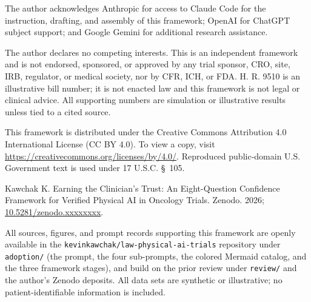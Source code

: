 
The author acknowledges Anthropic for access to Claude Code for the instruction,
drafting, and assembly of this framework; OpenAI for ChatGPT subject support; and
Google Gemini for additional research assistance.

The author declares no competing interests. This is an independent framework and is
not endorsed, sponsored, or approved by any trial sponsor, CRO, site, IRB,
regulator, or medical society, nor by CFR, ICH, or FDA. H. R. 9510 is an
illustrative bill number; it is not enacted law and this framework is not legal or
clinical advice. All supporting numbers are simulation or illustrative results
unless tied to a cited source.

This framework is distributed under the Creative Commons Attribution 4.0
International License (CC BY 4.0). To view a copy, visit
\url{https://creativecommons.org/licenses/by/4.0/}. Reproduced public-domain U.S.
Government text is used under 17 U.S.C. \S~105.

Kawchak K. Earning the Clinician's Trust: An Eight-Question Confidence Framework
for Verified Physical AI in Oncology Trials. Zenodo. 2026;
\href{https://doi.org/10.5281/zenodo.xxxxxxxx}{10.5281/zenodo.xxxxxxxx}.

All sources, figures, and prompt records supporting this framework are openly
available in the \texttt{kevinkawchak/law-physical-ai-trials} repository under
\texttt{adoption/} (the prompt, the four sub-prompts, the colored Mermaid catalog,
and the three framework stages), and build on the prior review under
\texttt{review/} and the author's Zenodo deposits. All data sets are synthetic or
illustrative; no patient-identifiable information is included.
